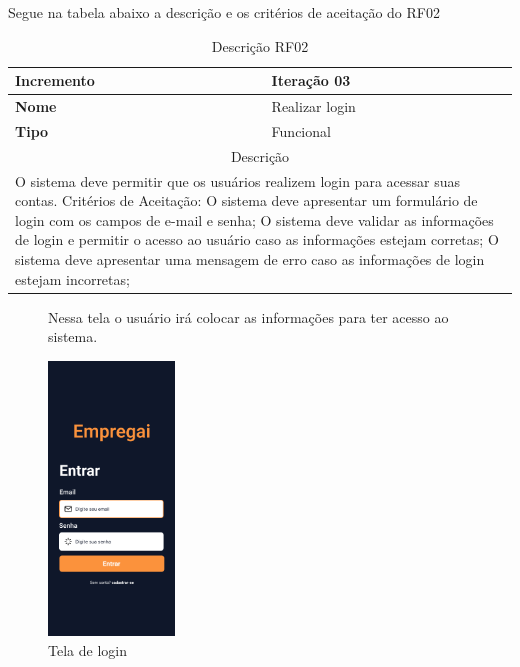 \clearpage
Segue na tabela abaixo a descrição e os critérios de aceitação do RF02
\begin{table}[htb]
	\centering
	\caption{\label{Formatação do texto.}Descrição RF02}	
	\begin{tabular}{|l|p{11cm}|}
		\hline
		\textbf{Incremento}    & Iteração 03\\ \hline
		\textbf{Nome}    & Realizar login\\ \hline
		\textbf{Tipo}    & Funcional\\ \hline
		\multicolumn{2}{|c|}{Descrição}\\ \hline
		\multicolumn{2}{|p{12cm}|}{
			O sistema deve permitir que os usuários realizem login para acessar suas contas. \newline
			\newline Critérios de Aceitação: \newline
			O sistema deve apresentar um formulário de login com os campos de e-mail e senha; \newline
			\newline O sistema deve validar as informações de login e permitir o acesso ao usuário caso as informações estejam corretas;\newline
			\newline O sistema deve apresentar uma mensagem de erro caso as informações de login estejam incorretas;
			}\\ \hline
	\end{tabular}
\end{table}

\begin{figure}[htb]
	Nessa tela o usuário irá colocar as informações para ter acesso ao sistema.
	\caption{Tela de login}
	\begin{center}
		\includegraphics[width=0.3\textwidth]{images/RF02.png}
	\end{center}
\end{figure}

